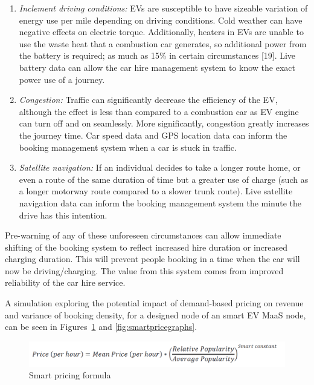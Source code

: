 \documentclass[journal]{IEEEtran}
\begin{document}
\begin{enumerate}
\item {\emph{Inclement driving conditions:}} EVs are susceptible to have
  sizeable variation of energy use per mile depending on driving
  conditions. Cold weather can have negative effects on electric
  torque. Additionally, heaters in EVs are unable to use the waste
  heat that a combustion car generates, so additional power from the
  battery is required; as much as 15\% in certain circumstances
  [19]. Live battery data can allow the car hire management system to
  know the exact power use of a journey.
\item {\emph{Congestion:}} Traffic can significantly decrease the efficiency of
  the EV, although the effect is less than compared to a combustion
  car as EV engine can turn off and on seamlessly. More significantly,
  congestion greatly increases the journey time. Car speed data and
  GPS location data can inform the booking management system when a
  car is stuck in traffic.
\item {\emph{Satellite navigation:}} If an individual decides to take a longer
  route home, or even a route of the same duration of time but a
  greater use of charge (such as a longer motorway route compared to a
  slower trunk route). Live satellite navigation data can inform the
  booking management system the minute the drive has this intention.
\end{enumerate}

Pre-warning of any of these unforeseen circumstances can allow
immediate shifting of the booking system to reflect increased hire
duration or increased charging duration. This will prevent people
booking in a time when the car will now be driving/charging. The value
from this system comes from improved reliability of the car hire
service.

A simulation exploring the potential impact of demand-based pricing on
revenue and variance of booking density, for a designed node of an
smart EV MaaS node, can be seen in
Figures~\ref{fig:smartpricingformula} and \ref{fig:smartpricegraphs}.

\begin{figure}[!h]
\centering
\includegraphics[width=\columnwidth]{images/smartpricingformula.png}
\caption{Smart pricing formula}
\label{fig:smartpricingformula}
\end{figure}
\end{document}

